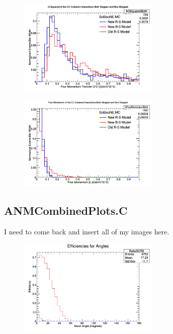 \documentclass[11pt]{article}
\begin{document}
\begin{figure}[H]
\centering
\includegraphics[width=0.6\textwidth]{NMFourSquaredPlottingImages/5-NMFourSquaredPlotting.png}
\caption{}
\end{figure}

\begin{figure}[H]
\centering
\includegraphics[width=0.6\textwidth]{NMFourSquaredPlottingImages/6-NMFourSquaredPlotting.png}
\caption{}
\end{figure}

\subsection{ANMCombinedPlots.C}
I need to come back and insert all of my images here.

\begin{figure}[H]
\centering
\includegraphics[width=0.6\textwidth]{ANMCombinedPlotsImages/1-ANMCombinedPlots.png}
\caption{}
\end{figure}
\end{document}
